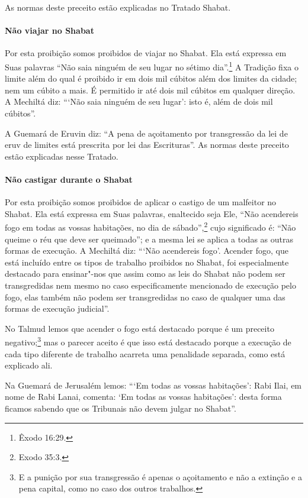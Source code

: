 \begin{multicols}{2}
As normas deste preceito estão explicadas no Tratado Shabat.

\paragraph{Não viajar no Shabat}

Por esta proibição somos proibidos de viajar no Shabat. Ela está
expressa em Suas palavras ``Não saia ninguém de seu lugar no sétimo
dia''.\footnote{Êxodo 16:29.} A Tradição fixa o limite além do qual é proibido ir
em dois mil cúbitos além dos limites da cidade; nem um cúbito a mais. É
permitido ir até dois mil cúbitos em qualquer direção. A Mechiltá\starr{} diz:
```Não saia ninguém de seu lugar': isto é, além de dois mil cúbitos''.

A Guemará\starr{} de Eruvin\starr{} diz: ``A pena de açoitamento por transgressão da lei
de eruv\starr{} de limites está prescrita por lei das Escrituras''. As normas
deste preceito estão explicadas nesse Tratado.

\paragraph{Não castigar durante o Shabat}

Por esta proibição somos proibidos de aplicar o castigo de um malfeitor
no Shabat. Ela está expressa em Suas palavras, enaltecido seja Ele,
``Não acendereis fogo em todas as vossas habitações, no dia de sábado'',\footnote{Exodo 35:3.} cujo significado é: ``Não queime o réu que deve ser
queimado''; e a mesma lei se aplica a todas as outras formas de
execução. A Mechiltá\starr{} diz: ```Não acendereis fogo'. Acender fogo, que
está incluído entre os tipos de trabalho proibidos no Shabat, foi
especialmente destacado para ensinar"-nos que assim como as leis do
Shabat não podem ser transgredidas nem mesmo no caso especificamente
mencionado de execução pelo fogo, elas também não podem ser
transgredidas no caso de qualquer uma das formas de execução judicial''.

No Talmud\starr{} lemos que acender o fogo está destacado porque é um preceito
negativo;\footnote{E a punição por sua transgressão é apenas o açoitamento e não a
  extinção e a pena capital, como no caso dos outros trabalhos.} mas o parecer aceito é que isso está
destacado porque a execução de cada tipo diferente de trabalho acarreta
uma penalidade separada, como está explicado ali.

Na Guemará\starr{} de Jerusalém lemos: ```Em todas as vossas habitações': Rabi
Ilai\starr, em nome de Rabi Lanai\starr, comenta: `Em todas as vossas habitações':
desta forma ficamos sabendo que os Tribunais não devem julgar no
Shabat''.


\end{multicols}
